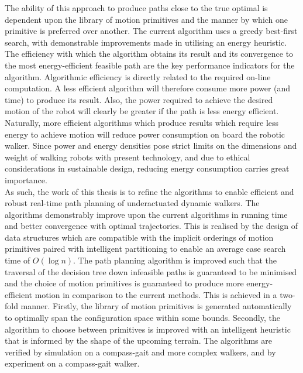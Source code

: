The ability of this approach to produce paths close to the true optimal is dependent upon the library of motion primitives and the manner by which one primitive is preferred over another.
The current algorithm uses a greedy best-first search, with demonstrable improvements made in utilising an energy heuristic. The efficiency with which the algorithm obtains its result and its convergence to the most energy-efficient feasible path are the key performance indicators for the algorithm. Algorithmic efficiency is directly related to the required on-line computation. A less efficient algorithm will therefore consume more power (and time) to produce its result. Also, the power required to achieve the desired motion of the robot will clearly be greater if the path is less energy efficient. Naturally, more efficient algorithms which produce results which require less energy to achieve motion will reduce power consumption on board the robotic walker. Since power and energy densities pose strict limits on the dimensions and weight of walking robots with present technology, and due to ethical considerations in sustainable design, reducing energy consumption carries great importance. \\

As such, the work of this thesis is to refine the algorithms to enable efficient and robust real-time path planning of underactuated dynamic walkers. The algorithms demonstrably improve upon the current algorithms in running time and better convergence with optimal trajectories. This is realised by the design of data structures which are compatible with the implicit orderings of motion primitives paired with intelligent partitioning to enable an average case search time of $O(\log{n})$. The path planning algorithm is improved such that the traversal of the decision tree down infeasible paths is guaranteed to be minimised and the choice of motion primitives is guaranteed to produce more energy-efficient motion in comparison to the current methods. This is achieved in a two-fold manner. Firstly, the library of motion primitives is generated automatically to optimally span the configuration space within some bounds. Secondly, the algorithm to choose between primitives is improved with an intelligent heuristic that is informed by the shape of the upcoming terrain. The algorithms are verified by simulation on a compass-gait and more complex walkers, and by experiment on a compass-gait walker.